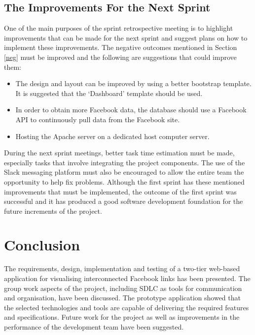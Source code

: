 \documentclass[12pt,onecolumn]{article}
\begin{document}
	
	\subsection{The Improvements For the Next Sprint}
	One of the main purposes of the sprint retrospective meeting is to highlight improvements that can be made for the next sprint and suggest plans on how to implement these improvements. The negative outcomes mentioned in Section \ref{neg} must be improved and the following are suggestions that could improve them:
	
	\begin{itemize}
		\item The design and  layout can be improved by using a better bootstrap template. It is suggested that the `Dashboard' template should be used.
		\item In order to obtain more Facebook data, the database should use a Facebook API to continuously pull data from the Facebook site. 
		\item Hosting the Apache server on a dedicated host computer server.
	\end{itemize}

	During the next sprint meetings, better task time estimation must be made, especially tasks that involve integrating the project components. The use of the Slack messaging platform must also be encouraged to allow the entire team the opportunity to help fix problems. Although the first sprint has these mentioned improvements that must be implemented, the outcome of the first sprint was successful and it has produced a good software development foundation for the future increments of the project.


	\section{Conclusion}

	The requirements, design, implementation and testing of a two-tier web-based application for visualising interconnected Facebook links has been presented. The group work aspects of the project, including SDLC as tools for communication and organisation, have been discussed. The prototype application showed that the selected technologies and tools are capable of delivering the required features and specifications. Future work for the project as well as improvements in the performance of the development team have been suggested.
\end{document}
